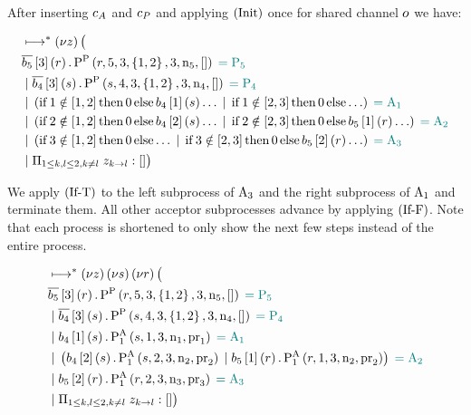 After inserting $c_A$ and $c_P$ and applying $\left(\operatorname{Init}\right)$ once for shared channel $o$ we have:

\begin{align*}
&\longmapsto^* \left(\nu z\right)\big (\\
&\overline{b_{5}}\left[3\right]\left(r\right).\operatorname{P^{P}_{}}\left(r, 5, 3, \left\{1, 2\right\}, 3, \operatorname{n}_5, \mathtt{[]}\right) \;\textcolor{teal}{= \operatorname{P_{5}}}\\
&\; | \; \overline{b_{4}}\left[3\right]\left(s\right).\operatorname{P^{P}_{}}\left(s, 4, 3, \left\{1, 2\right\}, 3, \operatorname{n}_4, \mathtt{[]}\right) \;\textcolor{teal}{= \operatorname{P_{4}}}\\
&\; | \; \left(
    \operatorname{if} 1 \notin \left[1, 2\right] \operatorname{then} 0 \operatorname{else} b_{4}\left[1\right]\left(s\right)\ldots
    \; | \; \operatorname{if} 1 \notin \left[2, 3\right] \operatorname{then} 0 \operatorname{else} \ldots
\right) \;\textcolor{teal}{= \operatorname{A_{1}}}\\
&\; | \; \left(
    \operatorname{if} 2 \notin \left[1, 2\right] \operatorname{then} 0 \operatorname{else} b_{4}\left[2\right]\left(s\right)\ldots
    \; | \; \operatorname{if} 2 \notin \left[2, 3\right] \operatorname{then} 0 \operatorname{else} b_{5}\left[1\right]\left(r\right)\ldots
\right) \;\textcolor{teal}{= \operatorname{A_{2}}}\\
&\; | \; \left(
    \operatorname{if} 3 \notin \left[1, 2\right] \operatorname{then} 0 \operatorname{else} \ldots
    \; | \; \operatorname{if} 3 \notin \left[2, 3\right] \operatorname{then} 0 \operatorname{else} b_{5}\left[2\right]\left(r\right)\ldots
\right) \;\textcolor{teal}{= \operatorname{A_{3}}}\\
&\; | \; \Pi_{1 \le k,l \le 2, k \neq l}\; z_{k\to l}:[]
\big )
\end{align*}

We apply $\left(\operatorname{If-T}\right)$ to the left subprocess of $\operatorname{A_{3}}$ and the right subprocess of $\operatorname{A_{1}}$ and terminate them.
All other acceptor subprocesses advance by applying $\left(\operatorname{If-F}\right)$.
Note that each process is shortened to only show the next few steps instead of the entire process.

\begin{align*}
&\longmapsto^* \left(\nu z\right)\left(\nu s\right)\left(\nu r\right) \big (\\
&\overline{b_{5}}\left[3\right]\left(r\right).\operatorname{P^{P}_{}}\left(r, 5, 3, \left\{1, 2\right\}, 3, \operatorname{n}_5, \mathtt{[]}\right) \;\textcolor{teal}{= \operatorname{P_{5}}}\\
&\; | \; \overline{b_{4}}\left[3\right]\left(s\right).\operatorname{P^{P}_{}}\left(s, 4, 3, \left\{1, 2\right\}, 3, \operatorname{n}_4, \mathtt{[]}\right) \;\textcolor{teal}{= \operatorname{P_{4}}}\\
&\; | \; b_{4}\left[1\right]\left(s\right) . \operatorname{P^{A}_{1}}\left(s, 1, 3, \operatorname{n}_1, \operatorname{pr}_1\right) \;\textcolor{teal}{= \operatorname{A_{1}}}\\
&\; | \; \left(
    b_{4}\left[2\right]\left(s\right) . \operatorname{P^{A}_{1}}\left(s, 2, 3, \operatorname{n}_2, \operatorname{pr}_2\right)
    \; | \;
    b_{5}\left[1\right]\left(r\right) . \operatorname{P^{A}_{1}}\left(r, 1, 3, \operatorname{n}_2, \operatorname{pr}_2\right)
\right) \;\textcolor{teal}{= \operatorname{A_{2}}}\\
&\; | \; b_{5}\left[2\right]\left(r\right) . \operatorname{P^{A}_{1}}\left(r, 2, 3, \operatorname{n}_3, \operatorname{pr}_3\right) \;\textcolor{teal}{= \operatorname{A_{3}}}\\
&\; | \; \Pi_{1 \le k,l \le 2, k \neq l}\; z_{k\to l}:[]
\big )
\end{align*}

